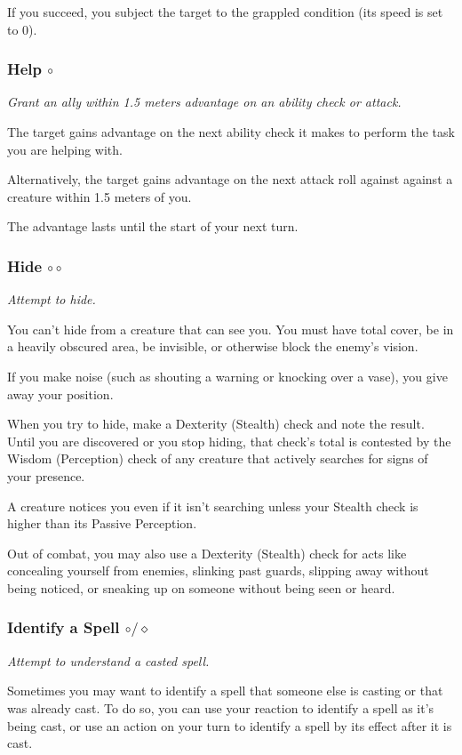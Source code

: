     If you succeed, you subject the target to the grappled condition (its speed is set to 0).
\subsubsection{Help $\circ$}
    \textit{Grant an ally within 1.5 meters advantage on an ability check or attack.}

    The target gains advantage on the next ability check it makes to perform the task you are helping with.

    Alternatively, the target gains advantage on the next attack roll against against a creature within 1.5 meters of you.

    The advantage lasts until the start of your next turn.
\subsubsection{Hide $\circ\circ$}
    \textit{Attempt to hide.}

    You can't hide from a creature that can see you.
    You must have total cover, be in a heavily obscured area, be invisible, or otherwise block the enemy's vision.

    If you make noise (such as shouting a warning or knocking over a vase), you give away your position.

    When you try to hide, make a Dexterity (Stealth) check and note the result.
    Until you are discovered or you stop hiding, that check's total is contested by the Wisdom (Perception) check of any creature that actively searches for signs of your presence.

    A creature notices you even if it isn't searching unless your Stealth check is higher than its Passive Perception.

    Out of combat, you may also use a Dexterity (Stealth) check for acts like concealing yourself from enemies, slinking past guards, slipping away without being noticed, or sneaking up on someone without being seen or heard.
\subsubsection{Identify a Spell $\circ/\diamond$}
    \textit{Attempt to understand a casted spell.}

    Sometimes you may want to identify a spell that someone else is casting or that was already cast.
    To do so, you can use your reaction to identify a spell as it's being cast, or use an action on your turn to identify a spell by its effect after it is cast.

